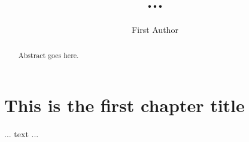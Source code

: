 \documentclass[11pt]{afthesis}
\author{First Author}
\title{...}
\begin{document}
%	

\flyleaf      			%

\disclaimerpage                 %

\titlepage			%

\approvalpage                   %

\begin{preface}
\end{preface}

\tableofcontents	%

\listoffigures  	%
\listoftables		%
\listofsymbols          %

\listofabbreviations

\begin{abstract}
	Abstract goes here. 
\end{abstract}


\chapter{This is the first chapter title} %
	... text ...		%
\end{document}
